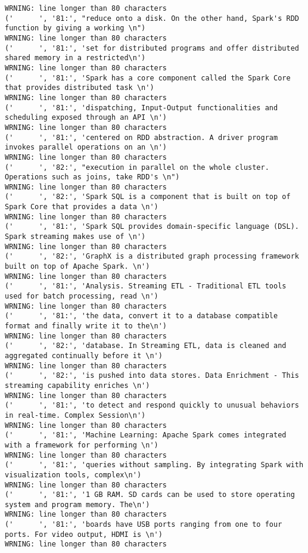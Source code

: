 \begin{tiny}
\begin{verbatim}
WRNING: line longer than 80 characters
('      ', '81:', "reduce onto a disk. On the other hand, Spark's RDD function by giving a working \n")
WRNING: line longer than 80 characters
('      ', '81:', 'set for distributed programs and offer distributed shared memory in a restricted\n')
WRNING: line longer than 80 characters
('      ', '81:', 'Spark has a core component called the Spark Core that provides distributed task \n')
WRNING: line longer than 80 characters
('      ', '81:', 'dispatching, Input-Output functionalities and scheduling exposed through an API \n')
WRNING: line longer than 80 characters
('      ', '81:', 'centered on RDD abstraction. A driver program invokes parallel operations on an \n')
WRNING: line longer than 80 characters
('      ', '82:', "execution in parallel on the whole cluster. Operations such as joins, take RDD's \n")
WRNING: line longer than 80 characters
('      ', '82:', 'Spark SQL is a component that is built on top of Spark Core that provides a data \n')
WRNING: line longer than 80 characters
('      ', '81:', 'Spark SQL provides domain-specific language (DSL). Spark streaming makes use of \n')
WRNING: line longer than 80 characters
('      ', '82:', 'GraphX is a distributed graph processing framework built on top of Apache Spark. \n')
WRNING: line longer than 80 characters
('      ', '81:', 'Analysis. Streaming ETL - Traditional ETL tools used for batch processing, read \n')
WRNING: line longer than 80 characters
('      ', '81:', 'the data, convert it to a database compatible format and finally write it to the\n')
WRNING: line longer than 80 characters
('      ', '82:', 'database. In Streaming ETL, data is cleaned and aggregated continually before it \n')
WRNING: line longer than 80 characters
('      ', '82:', 'is pushed into data stores. Data Enrichment - This streaming capability enriches \n')
WRNING: line longer than 80 characters
('      ', '81:', 'to detect and respond quickly to unusual behaviors in real-time. Complex Session\n')
WRNING: line longer than 80 characters
('      ', '81:', 'Machine Learning: Apache Spark comes integrated with a framework for performing \n')
WRNING: line longer than 80 characters
('      ', '81:', 'queries without sampling. By integrating Spark with visualization tools, complex\n')
WRNING: line longer than 80 characters
('      ', '81:', '1 GB RAM. SD cards can be used to store operating system and program memory. The\n')
WRNING: line longer than 80 characters
('      ', '81:', 'boards have USB ports ranging from one to four ports. For video output, HDMI is \n')
WRNING: line longer than 80 characters

\end{verbatim}
\end{tiny}
